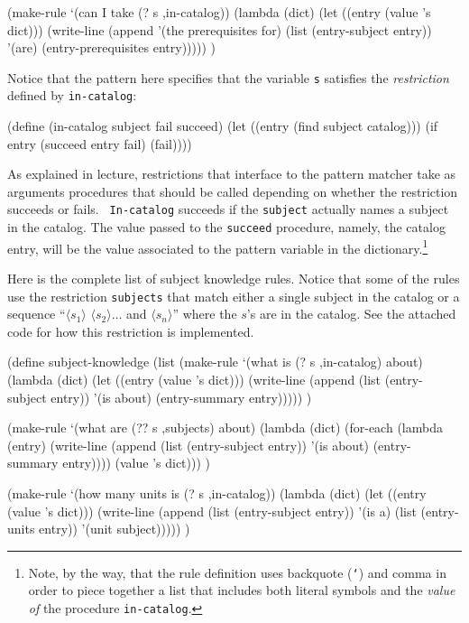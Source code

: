 \beginlisp
(make-rule
 `(can I take (? s ,in-catalog))
 (lambda (dict)
   (let ((entry (value 's dict)))
     (write-line
      (append '(the prerequisites for)
              (list (entry-subject entry))
              '(are)
              (entry-prerequisites entry))))) )
\endlisp

Notice that the pattern here specifies that the variable {\tt s} satisfies
the {\em restriction} defined by {\tt in-catalog}:

\beginlisp
(define (in-catalog subject fail succeed)
  (let ((entry (find subject catalog)))
    (if entry
        (succeed entry fail)
        (fail))))
\endlisp

As explained in lecture, restrictions that interface to the pattern
matcher take as arguments procedures that should be called
depending on whether the restriction succeeds or fails.  {\tt
In-catalog} succeeds if the {\tt subject} actually names a subject in
the catalog.  The value passed to the {\tt succeed} procedure, namely,
the catalog entry, will be the value associated to the pattern
variable in the dictionary.\footnote{Note, by the way, that the rule
definition uses backquote ({\tt `}) and comma in order to piece
together a list that includes both literal symbols and the {\em value
of} the procedure {\tt in-catalog}.}

Here is the complete list of subject knowledge rules.  Notice that
some of the rules use the restriction {\tt subjects} that match either
a single subject in the catalog or a sequence ``$\langle s_1\rangle $
$\langle s_2\rangle \ldots $ and $\langle s_n\rangle $'' where the
$s$'s are in the catalog.  See the attached code for how this
restriction is implemented.

\beginlisp
(define subject-knowledge 
  (list
   (make-rule
    `(what is (? s ,in-catalog) about)
    (lambda (dict)
      (let ((entry (value 's dict)))
        (write-line
         (append (list (entry-subject entry))
                 '(is about)
                 (entry-summary entry))))) )

   (make-rule
    `(what are (?? s ,subjects) about)
    (lambda (dict)
      (for-each (lambda (entry)
                  (write-line
                   (append (list (entry-subject entry))
                           '(is about)
                           (entry-summary entry))))
                (value 's dict))) )
    
   (make-rule
    `(how many units is (? s ,in-catalog))
    (lambda (dict)
      (let ((entry (value 's dict)))
        (write-line
         (append (list (entry-subject entry))
                 '(is a)
                 (list (entry-units entry))
                 '(unit subject))))) )

